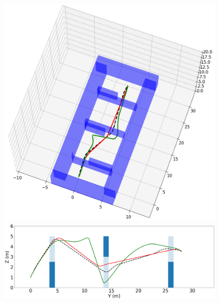
\begin{figure}[h!]
    \centering
    \begin{minipage}{0.48\linewidth}
        \centering
        \includegraphics[width=\linewidth]{figures/samp/3D_full_view.png}
    \end{minipage}%
    \hfill
    \begin{minipage}{0.48\linewidth}
        \centering
        \includegraphics[width=\linewidth]{figures/samp/3D_ZYprofile.png}

\end{minipage}
\end{figure}
